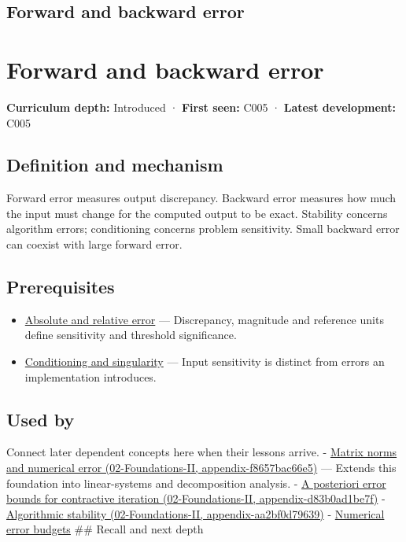 \hypertarget{appendix-a7fbaf6d1b1c}{}
\section*{Forward and backward error}
\chapter{Forward and backward error}\label{appendix-a7fbaf6d1b1c-forward-and-backward-error}

\textbf{Curriculum depth:} Introduced · \textbf{First seen:} C005 · \textbf{Latest development:} C005

\section{Definition and mechanism}\label{appendix-a7fbaf6d1b1c-definition-and-mechanism}

Forward error measures output discrepancy. Backward error measures how much the input must change for the computed output to be exact. Stability concerns algorithm errors; conditioning concerns problem sensitivity. Small backward error can coexist with large forward error.

\section{Prerequisites}\label{appendix-a7fbaf6d1b1c-prerequisites}

\begin{itemize}
\tightlist
\item
  \hyperref[appendix-3ae74e89b4e6]{Absolute and relative error} --- Discrepancy, magnitude and reference units define sensitivity and threshold significance.
\item
  \hyperref[appendix-8f6a01f284a7]{Conditioning and singularity} --- Input sensitivity is distinct from errors an implementation introduces.
\end{itemize}

\section{Used by}\label{appendix-a7fbaf6d1b1c-used-by}

Connect later dependent concepts here when their lessons arrive. - \href{../02-Foundations-II/main.pdf\#nameddest=appendix-f8657bac66e5}{Matrix norms and numerical error (02-Foundations-II, appendix-f8657bac66e5)} --- Extends this foundation into linear-systems and decomposition analysis. - \href{../02-Foundations-II/main.pdf\#nameddest=appendix-d83b0ad1be7f}{A posteriori error bounds for contractive iteration (02-Foundations-II, appendix-d83b0ad1be7f)} - \href{../02-Foundations-II/main.pdf\#nameddest=appendix-aa2bf0d79639}{Algorithmic stability (02-Foundations-II, appendix-aa2bf0d79639)} - \hyperref[appendix-31b8c295e05f]{Numerical error budgets} \#\# Recall and next depth


